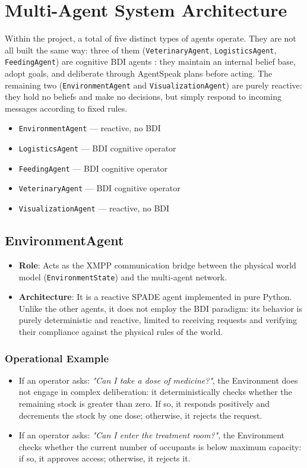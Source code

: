 \documentclass{article}
\renewcommand{\_}{\oldtextunderscore\allowbreak}
\begin{document}
\section{Multi-Agent System Architecture}
Within the project, a total of five distinct types of agents operate. They are not all built the same way: three of them (\texttt{VeterinaryAgent}, \texttt{LogisticsAgent}, \texttt{FeedingAgent}) are cognitive BDI agents : they maintain an internal belief base, adopt goals, and deliberate through AgentSpeak plans before acting. The remaining two (\texttt{EnvironmentAgent} and \texttt{VisualizationAgent}) are purely reactive: they hold no beliefs and make no decisions, but simply respond to incoming messages according to fixed rules.
\begin{itemize}
    \item \texttt{EnvironmentAgent} — reactive, no BDI
    \item \texttt{LogisticsAgent} — BDI cognitive operator
    \item \texttt{FeedingAgent} — BDI cognitive operator
    \item \texttt{VeterinaryAgent} — BDI cognitive operator
    \item \texttt{VisualizationAgent} — reactive, no BDI
\end{itemize}

\subsection{EnvironmentAgent}
\begin{itemize}
    \item \textbf{Role}: Acts as the XMPP communication bridge between the physical world model (\texttt{EnvironmentState}) and the multi-agent network.
    \item \textbf{Architecture}: It is a reactive SPADE agent implemented in pure Python. Unlike the other agents, it does not employ the BDI paradigm: its behavior is purely deterministic and reactive, limited to receiving requests and verifying their compliance against the physical rules of the world.
\end{itemize}
\subsubsection{Operational Example}
\begin{itemize}
    \item If an operator asks: \textit{"Can I take a dose of medicine?"}, the Environment does not engage in complex deliberation: it deterministically checks whether the remaining stock is greater than zero. If so, it responds positively and decrements the stock by one dose; otherwise, it rejects the request.
    \item If an operator asks: \textit{"Can I enter the treatment room?"}, the Environment checks whether the current number of occupants is below maximum capacity: if so, it approves access; otherwise, it rejects it.
\end{itemize}
\end{document}
